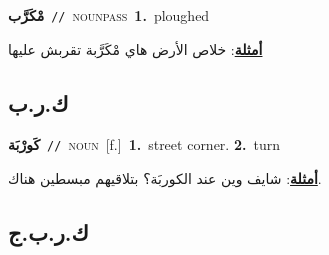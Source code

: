 \documentclass[10pt,a4paper,twoside]{article} %
\begin{document}
\begin{multicols}{2}
{\setlength\topsep{0pt}\textbf{\foreignlanguage{arabic}{مْكَرَّب}}\ {\color{gray}\texttt{//}\color{black}}\ \textsc{noun\textunderscore pass}\ \textbf{1.}~ploughed\  \begin{flushright}\color{gray}\foreignlanguage{arabic}{\textbf{\underline{\foreignlanguage{arabic}{أمثلة}}}: خلاص الأرض هاي مْكَرَّبة تقربش عليها}\end{flushright}\color{black}} \vspace{2mm}

\vspace{-3mm}
\subsection*{\color{blue}\foreignlanguage{arabic}{ك.ر.ب}\color{blue}{ (ntws)}} 

{\setlength\topsep{0pt}\textbf{\foreignlanguage{arabic}{كَورْبَة}}\ {\color{gray}\texttt{//}\color{black}}\ \textsc{noun}\ [f.]\ \textbf{1.}~street corner.  \textbf{2.}~turn\  \begin{flushright}\color{gray}\foreignlanguage{arabic}{\textbf{\underline{\foreignlanguage{arabic}{أمثلة}}}: شايف وين عند الكوربَة؟ بتلاقيهم مبسطين هناك.}\end{flushright}\color{black}} \vspace{2mm}

\vspace{-3mm}
\subsection*{\color{blue}\foreignlanguage{arabic}{ك.ر.ب.ج}\color{blue}{}} 


\end{multicols}
\end{document}
